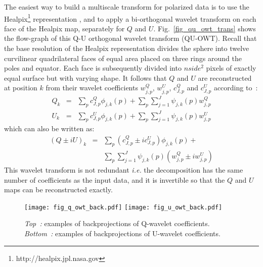 The easiest way to build a multiscale transform for polarized data is to use the Healpix\footnote{http://healpix.jpl.nasa.gov} 
representation \citep{pixel:healpix}, and to apply a bi-orthogonal wavelet transform on each face of the Healpix map, separately for $Q$ and $U$.
Fig.~\ref{fig_qu_owt_trans} shows the flow-graph of this Q-U orthogonal wavelet transform (QU-OWT). Recall that the base resolution of the Healpix 
representation divides the sphere into twelve curvilinear quadrilateral faces of equal area placed on three rings around the poles and equator. 
Each face is subsequently divided into $nside^{2}$ pixels of exactly equal surface but with varying shape. It follows that $Q$ and $U$ are 
reconstructed at position $k$ from their wavelet coefficients $w_{j,p}^Q$, $w_{j,p}^U$, $c^Q_{J,p}$ and $c^U_{J,p}$ according to~: 
  \begin{eqnarray}
 Q_k &  =  &  \sum_p c^Q_{J,p} \phi_{j,k}(p) + \sum_p \sum_{j=1}^J \psi_{j,k}(p)w_{j,p}^Q \\ \nonumber
 U_k  & =  &  \sum_p c^U_{J,p} \phi_{j,k}(p) + \sum_p \sum_{j=1}^J \psi_{j,k}(p)w_{j,p}^U
 \end{eqnarray}
which can also be written as:
 \begin{eqnarray}
(Q \pm iU)_k & =  & \sum_p (c^Q_{J,p} \pm i c^U_{J,p}) \phi_{j,k}(p) + \nonumber \\
                      &  &  \sum_p \sum_{j=1}^J \psi_{j,k}(p) ( w_{j,p}^Q \pm i w_{j,p}^U )
\label{eq_qu_owt}
\end{eqnarray}
This wavelet transform is not redundant \textit{i.e.} the decomposition has the same number of coefficients as the input data, and it is invertible so that the $Q$ and $U$ maps can be reconstructed exactly.\\

\begin{figure}[htb]
\centerline{
\vbox{
 \texttt{[image: fig\_q\_owt\_back.pdf]}
 \texttt{[image: fig\_u\_owt\_back.pdf]}
}
}
\caption{ \textit{Top~:} examples of backprojections of Q-wavelet coefficients. \textit{Bottom~:} examples of backprojections of U-wavelet coefficients.}
\label{fig_qu_owt_back}
\end{figure}

